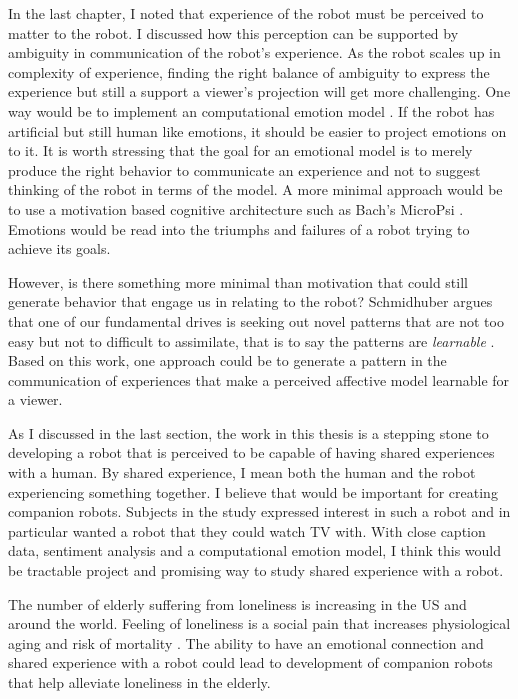 In the last chapter, I noted that experience of the robot must be perceived to matter to the robot. I discussed how this perception can be supported by ambiguity in communication of the robot's experience. As the robot scales up in complexity of experience, finding the right balance of ambiguity to express the experience but still a support a viewer's projection  will get more challenging. One way would be to implement an computational emotion model \cite{marsella_computational_emotion}. If the robot has artificial but still human like emotions, it should be easier to project emotions on to it. It is worth stressing that the goal for an emotional model is to merely produce the right behavior to communicate an experience and not to suggest thinking of the robot in terms of the model. A more minimal approach would be to use a motivation based cognitive architecture such as Bach's MicroPsi \cite{bach_micropsi}. Emotions would be read into the triumphs and failures of a robot trying to achieve its goals. 

However, is there something more minimal than motivation that could still generate behavior that engage us in relating to the robot? Schmidhuber argues that one of our fundamental drives is seeking out novel patterns that are not too easy but not to difficult to assimilate, that is to say the patterns are \emph{learnable} \cite{schmidhuber_art_science}. Based on this work, one approach could be to generate a pattern in the communication of experiences that make a perceived affective model learnable for a viewer. 

As I discussed in the last section, the work in this thesis is a stepping stone to developing a robot that is perceived to be capable of having shared experiences with a human. By shared experience, I mean both the human and the robot experiencing something together. I believe that would be important for creating companion robots. Subjects in the study expressed interest in such a robot and in particular wanted a robot that they could watch TV with. With close caption data, sentiment analysis and a computational emotion model, I think this would be tractable project and promising way to study shared experience with a robot. 

The number of elderly suffering from loneliness is increasing in the US and around the world. Feeling of loneliness is a social pain that increases physiological aging and risk of mortality \cite{hawkley_loneliness_matters}. The ability to have an emotional connection and shared experience with a robot could lead to development of companion robots that help alleviate loneliness in the elderly. 



